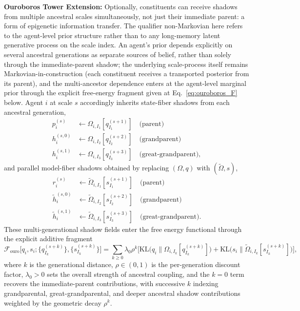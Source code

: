 \documentclass[11pt]{article}
\begin{document}
\textbf{Ouroboros Tower Extension:} Optionally, constituents can receive shadows from multiple ancestral scales simultaneously, not just their immediate parent: a form of epigenetic information transfer. The qualifier non-Markovian here refers to the agent-level prior structure rather than to any long-memory latent generative process on the scale index. An agent's prior depends explicitly on several ancestral generations as separate sources of belief, rather than solely through the immediate-parent shadow; the underlying scale-process itself remains Markovian-in-construction (each constituent receives a transported posterior from its parent), and the multi-ancestor dependence enters at the agent-level marginal prior through the explicit free-energy fragment given at Eq.~\eqref{eq:ouroboros_F} below. Agent $i$ at scale $s$ accordingly inherits state-fiber shadows from each ancestral generation,
\begin{align}
p_i^{(s)} &\leftarrow \Omega_{i,I_1}[q_{I_1}^{(s+1)}] \quad \text{(parent)} \\
h_i^{(s,0)} &\leftarrow \Omega_{i,I_2}[q_{I_2}^{(s+2)}] \quad \text{(grandparent)} \\
h_i^{(s,1)} &\leftarrow \Omega_{i,I_3}[q_{I_3}^{(s+3)}] \quad \text{(great-grandparent)},
\end{align}
and parallel model-fiber shadows obtained by replacing $(\Omega, q)$ with $(\tilde\Omega, s)$,
\begin{align}
r_i^{(s)} &\leftarrow \tilde\Omega_{i,I_1}[s_{I_1}^{(s+1)}] \quad \text{(parent)} \\
\tilde h_i^{(s,0)} &\leftarrow \tilde\Omega_{i,I_2}[s_{I_2}^{(s+2)}] \quad \text{(grandparent)} \\
\tilde h_i^{(s,1)} &\leftarrow \tilde\Omega_{i,I_3}[s_{I_3}^{(s+3)}] \quad \text{(great-grandparent)}.
\end{align}
These multi-generational shadow fields enter the free energy functional through the explicit additive fragment
\begin{equation}
\mathcal{F}_{\mathrm{ouro}}\big[q_i, s_i; \{q_{I_k}^{(s+k)}\}, \{s_{I_k}^{(s+k)}\}\big] = \sum_{k \ge 0} \lambda_0 \rho^k \Big[ \mathrm{KL}\big(q_i \big\| \Omega_{i,I_k}[q_{I_k}^{(s+k)}]\big) + \mathrm{KL}\big(s_i \big\| \tilde\Omega_{i,I_k}[s_{I_k}^{(s+k)}]\big) \Big],
\label{eq:ouroboros_F}
\end{equation}
where $k$ is the generational distance, $\rho \in (0, 1)$ is the per-generation discount factor, $\lambda_0 > 0$ sets the overall strength of ancestral coupling, and the $k=0$ term recovers the immediate-parent contributions, with successive $k$ indexing grandparental, great-grandparental, and deeper ancestral shadow contributions weighted by the geometric decay $\rho^k$.
\end{document}
